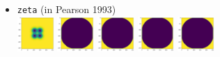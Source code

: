 \begin{itemize}
\item {\tt zeta} (in Pearson 1993)\\
\includegraphics[width=1.4cm]{python_codes/fieldstone_171/pearson93/zeta_solution_0001000_u}
\includegraphics[width=1.4cm]{python_codes/fieldstone_171/pearson93/zeta_solution_0010000_u}
\includegraphics[width=1.4cm]{python_codes/fieldstone_171/pearson93/zeta_solution_0030000_u}
\includegraphics[width=1.4cm]{python_codes/fieldstone_171/pearson93/zeta_solution_0050000_u}
\includegraphics[width=1.4cm]{python_codes/fieldstone_171/pearson93/zeta_solution_final_u}



\end{itemize}
